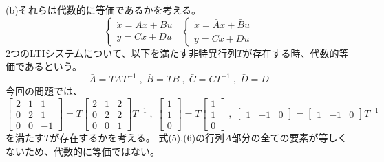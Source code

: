 \documentclass{jsarticle}
\begin{document}
(b)\;\;それらは代数的に等価であるかを考える。
\begin{equation}
  \left\{\begin{array} { l } 
  { \dot { x } = A x + B u } \\
  { y = C x + D u }
  \end{array} 
  \right.
  \;\;
  \left\{\begin{array} { l } 
    { \dot { x } = \bar{A} x + \bar{B} u } \\
    { y = \bar{C} x + \bar{D} u }
    \end{array} 
    \right.
\end{equation}
2つのLTIシステムについて、以下を満たす非特異行列$T$が存在する時、代数的等価であるという。
\begin{equation}
  \bar{A} = TAT^{-1}\;,\;\bar{B} = TB \;,\; \bar{C} = CT^{-1}\;,\;\bar{D} = D
\end{equation}
今回の問題では、
\begin{equation}
  \begin{bmatrix}
    2&1&1\\
    0&2&1\\
    0&0&-1
  \end{bmatrix} = T\begin{bmatrix}
    2&1&2\\
    0&2&2\\
    0&0&1
  \end{bmatrix}T^{-1}\;,\;\begin{bmatrix}
    1\\1\\0
  \end{bmatrix} = T\begin{bmatrix}
    1\\1\\0
  \end{bmatrix} \;,\; \begin{bmatrix}
    1&-1&0
  \end{bmatrix}= \begin{bmatrix}
    1&-1&0
  \end{bmatrix}T^{-1}
\end{equation}
を満たす$T$が存在するかを考える。
式(5),(6)の行列$A$部分の全ての要素が等しくないため、代数的に等価ではない。
\end{document}
